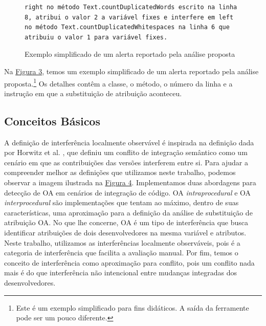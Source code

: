 \begin{figure}[!h]
    \begin{lstlisting}[escapechar=!]
right no método Text.countDuplicatedWords escrito na linha 8, atribui o valor 2 a variável fixes e interfere em left no método Text.countDuplicatedWhitespaces na linha 6 que atribuiu o valor 1 para variável fixes.
    \end{lstlisting}
    \caption{Exemplo simplificado de um alerta reportado pela análise proposta}
    \label{fig:report-caso-motivador}
\end{figure}

Na \hyperref[fig:report-caso-motivador]{Figura 3}, temos um exemplo simplificado de um alerta reportado pela análise proposta.\footnote{Este é um exemplo simplificado para fins didáticos. A saída da ferramente pode ser um pouco diferente.} Os detalhes contêm a classe, o método, o número da linha e a instrução em que a substituição de atribuição aconteceu.

\subsection{Conceitos Básicos}

A definição de interferência localmente observável é inspirada na definição dada por Horwitz et al. \cite{Horwitz1989IntegratingNV}, que definiu um conflito de integração semântico como um cenário em que as contribuições das versões interferem entre si. Para ajudar a compreender melhor as definições que utilizamos neste trabalho, podemos observar a imagem ilustrada na  \hyperref[fig:analysis]{Figura 4}. Implementamos duas abordagens para detecção de OA em cenários de integração de código. OA \emph{intraprocedural} e OA \emph{interprocedural} são implementações que tentam ao máximo, dentro de suas características, uma aproximação para a definição da análise de substituição de atribuição OA. No que lhe concerne, OA é um tipo de interferência que busca identificar atribuições de dois desenvolvedores na mesma variável e atributos. Neste trabalho, utilizamos as interferências localmente observáveis, pois é a categoria de interferência que facilita a avaliação manual. Por fim, temos o conceito de interferência como aproximação para conflito, pois um conflito nada mais é do que interferência não intencional entre mudanças integradas dos desenvolvedores.

